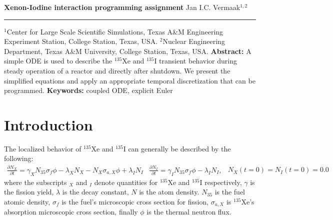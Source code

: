 \documentclass[10pt,letterpaper,notitlepage]{article}
\newcommand{\DOCTITLE}{Xenon-Iodine interaction programming assignment}
\newcommand{\dxdy}[2]{\frac{\partial #1}{\partial #2}}
\newcommand{\beqn}{\begin{equation}\begin{aligned}}
\newcommand{\eeqn}{\end{aligned}\end{equation}}
\begin{document}
\noindent
{\LARGE\textbf{\DOCTITLE}}
\newline
\newline
\newline
\noindent
{\Large Jan I.C. Vermaak$^{1,2}$}
\newline
\noindent\rule{\textwidth}{1pt}
{\small $^1$Center for Large Scale Scientific Simulations, Texas A\&M Engineering Experiment Station, College Station, Texas, USA.}
\newline\noindent
{\small $^2$Nuclear Engineering Department, Texas A\&M University, College Station, Texas, USA.}
\newline
\newline
\textbf{Abstract:}\newline\noindent
A simple ODE is used to describe the ${^{135}}$Xe and ${^{135}}$I transient behavior during steady operation of a reactor and directly after shutdown. We present the simplified equations and apply an appropriate temporal discretization that can be programmed.
\newline
\newline\noindent
{\small
\textbf{Keywords:} coupled ODE, explicit Euler}

\section{Introduction}
The localized behavior of ${^{135}}$Xe and ${^{135}}$I can generally be described by the following:
\begin{subequations}
\beqn 
\dxdy{N_X}{t} = \gamma_X N_{35} \sigma_f \phi  - \lambda_X N_X - N_X \sigma_{a,X} \phi + \lambda_I N_I
\eeqn 
\beqn 
\dxdy{N_I}{t} = \gamma_I N_{35} \sigma_f \phi - \lambda_I N_I,
\eeqn 
\beqn 
N_X(t=0) = N_I(t=0) = 0.0
\eeqn 
\end{subequations}
\newline 
\newline
where the subscripts $_X$ and $_I$ denote quantities for ${^{135}}$Xe and ${^{135}}$I respectively, $\gamma$ is the fission yield, $\lambda$ is the decay constant, $N$ is the atom density. $N_{35}$ is the fuel atomic density, $\sigma_f$ is the fuel's microscopic cross section for fission, $\sigma_{a,X}$ is $^{135}$Xe's absorption microscopic cross section, finally $\phi$ is the thermal neutron flux.
\end{document}

